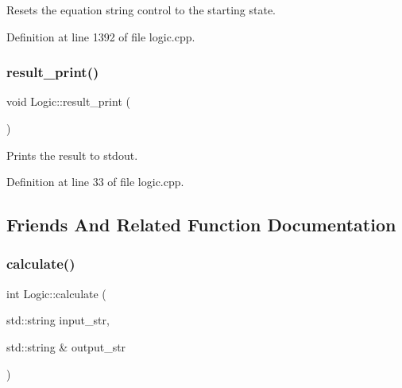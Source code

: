 Resets the equation string control to the starting state. 



Definition at line 1392 of file logic.\+cpp.


\begin{DoxyCode}{0}

\end{DoxyCode}
\mbox{\label{class_logic_a014ef0be6c84ba01f492c8f789409cd3}} 
\subsubsection{\texorpdfstring{result\_print()}{result\_print()}}
{\footnotesize\ttfamily void Logic\+::result\+\_\+print (\begin{DoxyParamCaption}{ }\end{DoxyParamCaption})}



Prints the result to stdout. 



Definition at line 33 of file logic.\+cpp.


\begin{DoxyCode}{0}

\end{DoxyCode}


\subsection{Friends And Related Function Documentation}
\mbox{\label{class_logic_a93c8b12c4525549e7da3731ae7c53c7c}} 
\subsubsection{\texorpdfstring{calculate()}{calculate()}\hspace{0.1cm}{\footnotesize\ttfamily [1/2]}}
{\footnotesize\ttfamily int Logic\+::calculate (\begin{DoxyParamCaption}\item[{std\+::string}]{input\+\_\+str,  }\item[{std\+::string \&}]{output\+\_\+str }\end{DoxyParamCaption})\hspace{0.3cm}{\ttfamily [related]}}



